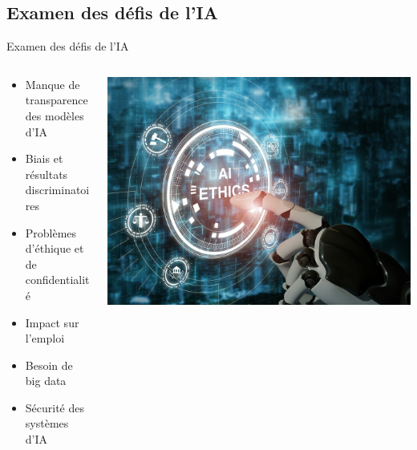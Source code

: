 \documentclass{beamer}
\begin{document}
\subsection{Examen des défis de l'IA}
\begin{frame}{Examen des défis de l'IA}
	\begin{columns}[T]
		\begin{column}{0.5\textwidth}
			\begin{itemize}
				\item Manque de transparence des modèles d'IA
				\item Biais et résultats discriminatoires
				\item Problèmes d'éthique et de confidentialité
				\item Impact sur l'emploi
				\item Besoin de big data
				\item Sécurité des systèmes d'IA
			\end{itemize}
		\end{column}
		\begin{column}{0.5\textwidth}
			\includegraphics[width=\textwidth]{AI-ethics.jpg}
		\end{column}
	\end{columns}
\end{frame}
\end{document}
